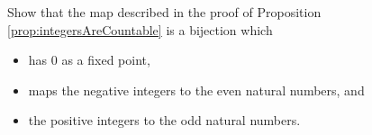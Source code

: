 \guard



\begin{exercise}
\label{exercise:paritionOfIntegers}
  Show that the map described in the proof of Proposition \ref{prop:integersAreCountable} is a bijection which
  \begin{itemize}
    \item has $0$ as a fixed point,
    \item maps the negative integers to the even natural numbers, and
    \item the positive integers to the odd natural numbers.
  \end{itemize}
\end{exercise}
